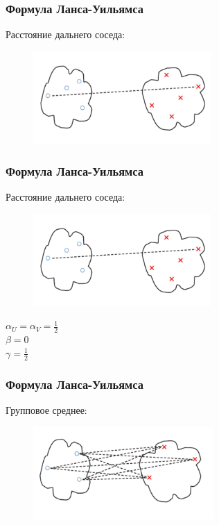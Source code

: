 \documentclass[12pt]{beamer}
\begin{document}
\begin{frame}\frametitle{Формула Ланса-Уильямса}
Расстояние дальнего соседа:\\
\begin{figure}[htbp]
  \includegraphics[height=100pt, keepaspectratio = true]{images/lans2}  
\end{figure}
\end{frame}

\begin{frame}\frametitle{Формула Ланса-Уильямса}
Расстояние дальнего соседа:\\
\begin{figure}[htbp]
  \includegraphics[height=100pt, keepaspectratio = true]{images/lans2}  
\end{figure}
${\alpha_U = \alpha_V = \frac{1}{2}}$ \\${\beta = 0}$ \\${\gamma = \frac{1}{2}}$
\end{frame}

\begin{frame}\frametitle{Формула Ланса-Уильямса}
Групповое среднее:\\
\begin{figure}[htbp]
  \includegraphics[height=100pt, keepaspectratio = true]{images/lans3}  
\end{figure}
\end{frame}
\end{document}
